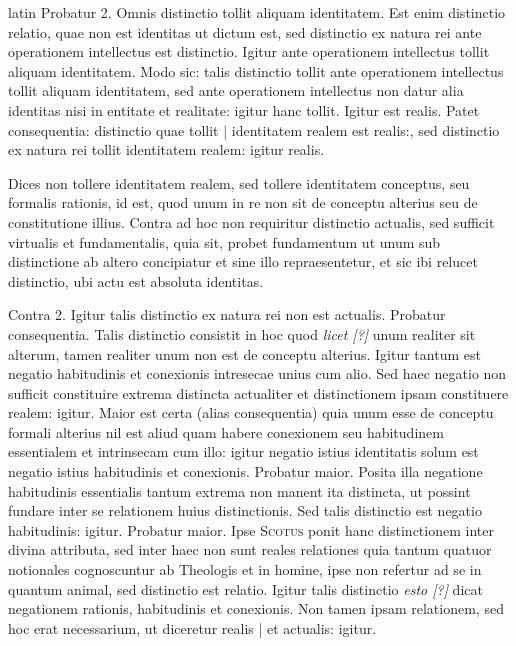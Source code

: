 \begin{otherlanguage*}{latin}
\pstart
 Probatur 2. Omnis distinctio tollit aliquam identitatem. Est enim distinctio relatio, quae non est identitas ut dictum est, sed distinctio ex natura rei ante operationem intellectus est distinctio. Igitur ante operationem intellectus tollit aliquam identitatem. Modo sic: talis distinctio tollit ante operationem intellectus tollit aliquam identitatem, sed ante operationem intellectus non datur alia identitas nisi in entitate et realitate: igitur hanc tollit. Igitur est realis. Patet consequentia: distinctio quae tollit \textnormal{|} identitatem realem est realis:, sed distinctio ex natura rei tollit identitatem realem: igitur realis. 
\pend

\pstart
 Dices non tollere identitatem realem, sed tollere identitatem conceptus, seu formalis rationis, id est, quod unum in re non sit de conceptu alterius seu de constitutione illius. Contra ad hoc non requiritur distinctio actualis, sed sufficit virtualis et fundamentalis, quia sit, probet fundamentum ut unum sub distinctione ab altero concipiatur et sine illo repraesentetur, et sic ibi relucet distinctio, ubi actu est absoluta identitas. 
\pend

\pstart
 Contra 2. Igitur talis distinctio ex natura rei non est actualis. Probatur consequentia. Talis distinctio consistit in hoc quod \emph{licet [?]} unum realiter sit alterum, tamen realiter unum non est de conceptu alterius. Igitur tantum est negatio habitudinis et conexionis intresecae unius cum alio. Sed haec negatio non sufficit constituire extrema distincta actualiter et distinctionem ipsam constituere realem: igitur. Maior est certa (alias consequentia) quia unum esse de conceptu formali alterius nil est aliud quam habere conexionem seu habitudinem essentialem et intrinsecam cum illo: igitur negatio istius identitatis solum est negatio istius habitudinis et conexionis. Probatur maior. Posita illa negatione habitudinis essentialis tantum extrema non manent ita distincta, ut possint fundare inter se relationem huius distinctionis. Sed talis distinctio est negatio habitudinis: igitur. Probatur maior. Ipse \textsc{Scotus} ponit hanc distinctionem inter divina attributa, sed inter haec non sunt reales relationes quia tantum quatuor notionales cognoscuntur ab Theologis et in homine, ipse non refertur ad se in quantum animal, sed distinctio est relatio. Igitur talis distinctio \emph{esto [?]} dicat negationem rationis, habitudinis et conexionis. Non tamen ipsam relationem, sed hoc erat necessarium, ut diceretur realis \textnormal{|}  et actualis: igitur. 
\pend


\end{otherlanguage*}
